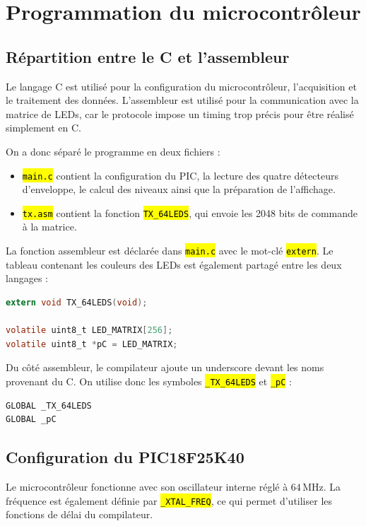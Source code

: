 \documentclass{report}
\let\OldTexttt\texttt
\renewcommand{\texttt}[1]{\OldTexttt{\hl{#1}}}
\begin{document}
\chapter{Programmation du microcontrôleur}

\section{Répartition entre le C et l'assembleur}

Le langage C est utilisé pour la configuration du microcontrôleur, l'acquisition et le traitement des données. L'assembleur est utilisé pour la communication avec la matrice de LEDs, car le protocole impose un timing trop précis pour être réalisé simplement en C.

On a donc séparé le programme en deux fichiers :
\begin{itemize}
    \item \texttt{main.c} contient la configuration du PIC, la lecture des quatre détecteurs d'enveloppe, le calcul des niveaux ainsi que la préparation de l'affichage.
    \item \texttt{tx.asm} contient la fonction \texttt{TX\_64LEDS}, qui envoie les 2048 bits de commande à la matrice.
\end{itemize}

La fonction assembleur est déclarée dans \texttt{main.c} avec le mot-clé \texttt{extern}. Le tableau contenant les couleurs des LEDs est également partagé entre les deux langages :

\begin{lstlisting}[language=C]
extern void TX_64LEDS(void);

volatile uint8_t LED_MATRIX[256];
volatile uint8_t *pC = LED_MATRIX;
\end{lstlisting}

Du côté assembleur, le compilateur ajoute un underscore devant les noms provenant du C. On utilise donc les symboles \texttt{\_TX\_64LEDS} et \texttt{\_pC} :

\begin{lstlisting}[language=MicroAsm]
GLOBAL _TX_64LEDS
GLOBAL _pC
\end{lstlisting}

\section{Configuration du PIC18F25K40}

Le microcontrôleur fonctionne avec son oscillateur interne réglé à \(64\,\mathrm{MHz}\). La fréquence est également définie par \texttt{\_XTAL\_FREQ}, ce qui permet d'utiliser les fonctions de délai du compilateur.
\end{document}

